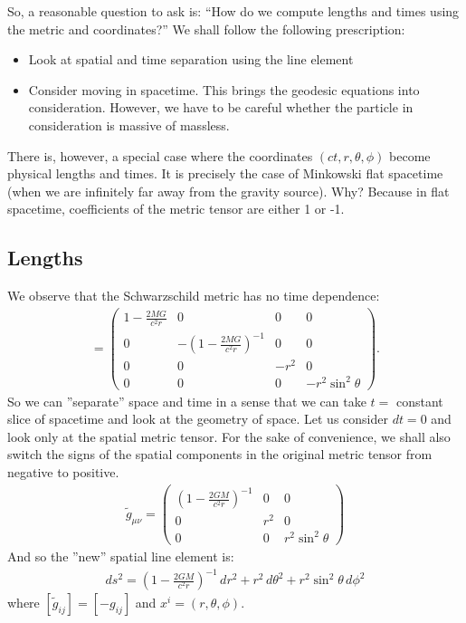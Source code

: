 \documentclass{book}
\theoremstyle{definition}
\begin{document}
So, a reasonable question to ask is: ``How do we compute lengths and times using the metric and coordinates?'' We shall follow the following prescription:
\begin{itemize}
	\item Look at spatial and time separation using the line element
	\item Consider moving in spacetime. This brings the geodesic equations into consideration. However, we have to be careful whether the particle in consideration is massive of massless.
\end{itemize}

There is, however, a special case where the coordinates $(ct, r, \theta, \phi)$ become physical lengths and times. It is precisely the case of Minkowski flat spacetime (when we are infinitely far away from the gravity source). Why? Because in flat spacetime, coefficients of the metric tensor are either 1 or -1.

\subsection{Lengths}
We observe that the Schwarzschild metric has no time dependence:
\begin{align*}
[g_{\mu\nu}]
	=
	\begin{pmatrix}
	1 - \frac{2MG}{c^2r} & 0 & 0 & 0\\
	0 & -\left(1 - \frac{2MG}{c^2r} \right) ^{-1} & 0 & 0\\
	0 & 0 & -r^2 & 0\\
	0 & 0 & 0 & -r^2\sin^2\theta
	\end{pmatrix}.
\end{align*}
So we can ''separate'' space and time in a sense that we can take $t=$ constant slice of spacetime and look at the geometry of space. Let us consider $dt = 0$ and look only at the spatial metric tensor. For the sake of convenience, we shall also switch the signs of the spatial components in the original metric tensor from negative to positive. 
\begin{align*}
\tilde{g}_{\mu\nu} = 
\begin{pmatrix}
\left( 1 - \frac{2GM}{c^2r}\right)^{-1} & 0 & 0\\
0 & r^2 & 0\\
0 & 0 & r^2\sin^2\theta 
\end{pmatrix}
\end{align*} 
And so the ''new'' spatial line element is:
\begin{align*}
ds^2 = \left( 1 - \frac{2GM}{c^2r}\right)^{-1}\,dr^2 + r^2\,d\theta^2 + r^2\sin^2\theta\,d\phi^2
\end{align*}
where $[\tilde{g}_{ij}] = [-g_{ij}]$ and $x^i = (r,\theta,\phi) $. \\
\end{document}
